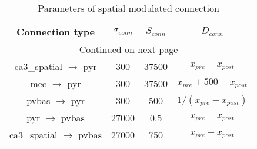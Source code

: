\begin{longtable}{cccc}
\caption{Parameters of spatial modulated connection}\label{spat_conn}\\
\toprule
Connection type & $\sigma_{conn}$ & $S_{conn}$ & $D_{conn}$ \\
\midrule
\endhead
\midrule
\multicolumn{4}{c}{{Continued on next page}} \\
\midrule
\endfoot

\bottomrule
\endlastfoot
ca3\_spatial $\rightarrow$  pyr  & 300 &    37500 &  $x_{pre} - x_{post}$  \\
mec $\rightarrow$  pyr  &   300 &     37500        &  $x_{pre} + 500 - x_{post}$\\
pvbas $\rightarrow$ pyr &   300 &      500       &  $1/(x_{pre} - x_{post})$\\
pyr $\rightarrow$ pvbas  &   27000   &     0.5 &  $x_{pre} - x_{post}$\\
ca3\_spatial $\rightarrow$ pvbas        &   27000  &      750 &  $x_{pre} - x_{post}$\\
\end{longtable}

